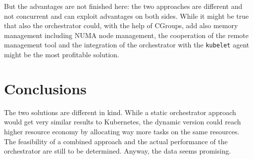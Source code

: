 \documentclass[]{scrartcl}
\begin{document}
But the advantages are not finished here: 
the two approaches are different and not concurrent and can exploit advantages on both sides.
While it might be true that also the orchestrator could, with the help of CGroups, add also memory management including NUMA node management, the cooperation of the remote management tool and the integration of the orchestrator with the \texttt{kubelet} agent might be the most profitable solution. 

\section{Conclusions}

The two solutions are different in kind. While a static orchestrator approach would get very similar results to Kubernetes, the dynamic version could reach higher resource economy by allocating way more tasks on the same resources.
The feasibility of a combined approach and the actual performance of the orchestrator are still to be determined. Anyway, the data seems promising.
\end{document}
